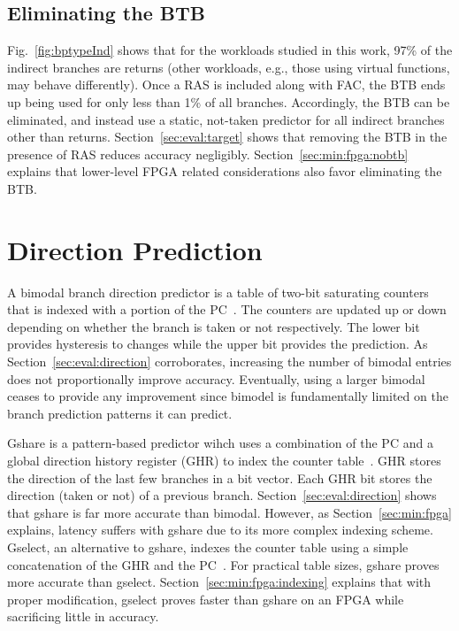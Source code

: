 
\subsection{Eliminating the BTB}
\label{sec:min:target:nobtb}
Fig.~\ref{fig:bptypeInd} shows that for the workloads studied in this work, 97\% of the indirect branches are returns (other workloads, e.g., those using virtual functions, may behave differently). Once a RAS is included along with FAC, the BTB ends up being used for only less than 1\% of all branches. Accordingly, the BTB can be eliminated, and instead use a static, not-taken predictor for all indirect branches other than returns. Section~\ref{sec:eval:target} shows that removing the BTB in the presence of RAS reduces accuracy negligibly. Section~\ref{sec:min:fpga:nobtb} explains that lower-level FPGA related considerations also favor eliminating the BTB.

\section{Direction Prediction}
\label{sec:min:direction}

A bimodal branch direction predictor is a table of two-bit saturating counters that is indexed with a portion of the PC~\cite{bimodal}. The counters are updated up or down depending on whether the branch is taken or not respectively. The lower bit provides hysteresis to changes while the upper bit provides the prediction. As Section~\ref{sec:eval:direction} corroborates, increasing the number of bimodal entries does not proportionally improve accuracy. Eventually, using a larger bimodal ceases to provide any improvement since bimodel is fundamentally limited on the branch prediction patterns it can predict.

Gshare is a pattern-based predictor wihch uses a combination of the PC and a global direction history register (GHR) to index the counter table~\cite{McFarling}. GHR stores the direction of the last few branches in a bit vector. Each GHR bit stores the direction (taken or not) of a previous branch.  Section~\ref{sec:eval:direction} shows that gshare is far more accurate than bimodal. However, as Section~\ref{sec:min:fpga} explains, latency suffers with gshare due to its more complex indexing scheme. Gselect, an alternative to gshare, indexes the counter table using a simple concatenation of the GHR and the PC~\cite{McFarling}. For practical table sizes, gshare proves more accurate than gselect. Section~\ref{sec:min:fpga:indexing} explains that with proper modification, gselect proves faster than gshare on an FPGA while sacrificing little in accuracy.

